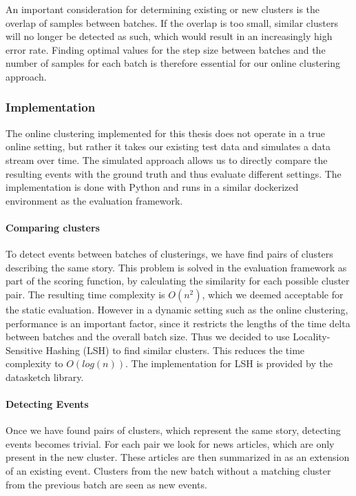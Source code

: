 An important consideration for determining existing or new clusters is the overlap of samples between batches. If the overlap is too small, similar clusters will no longer be detected as such, which would result in an increasingly high error rate. Finding optimal values for the step size between batches and the number of samples for each batch is therefore essential for our online clustering approach.

\subsubsection{Implementation}
\label{sec:online_clustering_implementation}

The online clustering implemented for this thesis does not operate in a true online setting, but rather it takes our existing test data and simulates a data stream over time. The simulated approach allows us to directly compare the resulting events with the ground truth and thus evaluate different settings. The implementation is done with Python and runs in a similar dockerized environment as the evaluation framework.

\paragraph{Comparing clusters}
To detect events between batches of clusterings,
we have find pairs of clusters describing the same story.
This problem is solved in the evaluation framework as part of the scoring function,
by calculating the similarity for each possible cluster pair.
The resulting time complexity is $O(n^2)$, which we deemed acceptable for the static evaluation.
However in a dynamic setting such as the online clustering, performance is an important factor,
since it restricts the lengths of the time delta between batches and the overall batch size.
Thus we decided to use Locality-Sensitive Hashing (LSH)\cite{alex2015practical} to find similar clusters.
This reduces the time complexity to $O(log(n))$.
The implementation for LSH is provided by the datasketch library\cite{eric_zhu_2017_290602}.


\paragraph{Detecting Events}
Once we have found pairs of clusters, which represent the same story, detecting events becomes trivial.
For each pair we look for news articles, which are only present in the new cluster.
These articles are then summarized in as an extension of an existing event.
Clusters from the new batch without a matching cluster from the previous batch
are seen as new events.

